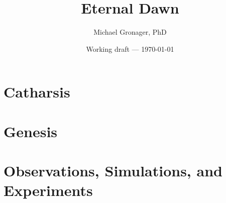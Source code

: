 \documentclass[11pt,twoside,openright,a4paper]{memoir}
\title{Eternal Dawn}
\author{Michael Gronager, PhD}
\date{Working draft --- \today}
\begin{document}
\frontmatter





\tableofcontents


\mainmatter
\setcounter{chapter}{-1}


\part{Catharsis}






\part{Genesis}





\part{Observations, Simulations, and Experiments}






\appendix




\backmatter


\end{document}
